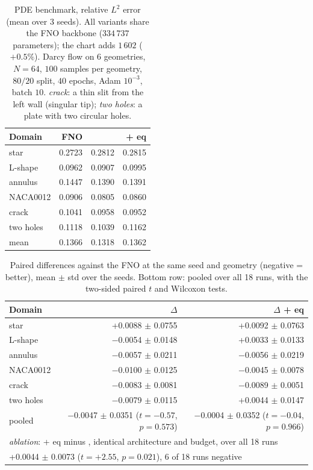 \begin{table}[t]
\centering
\small
\setlength{\tabcolsep}{5pt}
\caption{PDE benchmark, relative $L^2$ error (mean over 3 seeds).  All variants share the FNO backbone ($334\,737$ parameters); the chart adds $1\,602$ ($+0.5\%$).  Darcy flow on 6 geometries, $N=64$, $100$ samples per geometry, $80/20$ split, $40$ epochs, Adam $10^{-3}$, batch $10$.  \emph{crack}: a thin slit from the left wall (singular tip); \emph{two holes}: a plate with two circular holes.}
\label{tab:benchmark}
\begin{tabular}{lrrr}
\toprule
Domain & FNO & \DAO{} & \DAO{} + eq \\
\midrule
star & 0.2723 & 0.2812 & 0.2815 \\
L-shape & 0.0962 & 0.0907 & 0.0995 \\
annulus & 0.1447 & 0.1390 & 0.1391 \\
NACA0012 & 0.0906 & 0.0805 & 0.0860 \\
crack & 0.1041 & 0.0958 & 0.0952 \\
two holes & 0.1118 & 0.1039 & 0.1162 \\
\midrule
mean & 0.1366 & 0.1318 & 0.1362 \\
\bottomrule
\end{tabular}
\end{table}

\begin{table}[t]
\centering
\small
\setlength{\tabcolsep}{6pt}
\caption{Paired differences against the FNO at the same seed and geometry (negative = better), mean $\pm$ std over the seeds.  Bottom row: pooled over all 18 runs, with the two-sided paired $t$ and Wilcoxon tests.}
\label{tab:paired}
\begin{tabular}{lrr}
\toprule
Domain & $\Delta$\DAO{} & $\Delta$\DAO{} + eq \\
\midrule
star & +0.0088 $\pm$ 0.0755 & +0.0092 $\pm$ 0.0763 \\
L-shape & $-$0.0054 $\pm$ 0.0148 & +0.0033 $\pm$ 0.0133 \\
annulus & $-$0.0057 $\pm$ 0.0211 & $-$0.0056 $\pm$ 0.0219 \\
NACA0012 & $-$0.0100 $\pm$ 0.0125 & $-$0.0045 $\pm$ 0.0078 \\
crack & $-$0.0083 $\pm$ 0.0081 & $-$0.0089 $\pm$ 0.0051 \\
two holes & $-$0.0079 $\pm$ 0.0115 & +0.0044 $\pm$ 0.0147 \\
\midrule
pooled & $-$0.0047 $\pm$ 0.0351 ($t=-0.57$, $p=0.573$) & $-$0.0004 $\pm$ 0.0352 ($t=-0.04$, $p=0.966$) \\
\midrule
\multicolumn{3}{l}{\emph{ablation}: \DAO{} + eq minus \DAO{}, identical architecture and budget, over all 18 runs}\\
\multicolumn{3}{l}{\hspace{1em}+0.0044 $\pm$ 0.0073 ($t=+2.55$, $p=0.021$), 6 of 18 runs negative}\\
\bottomrule
\end{tabular}
\end{table}

